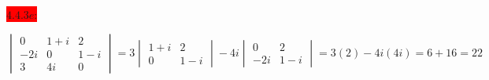 \documentclass{exam}
\begin{document}
  \colorbox{red}{\underline{$4.4.3e$}:}
  \begin{solution}
    \[
      \begin{vmatrix}
        0 & 1 + i & 2 \\
        -2i & 0 & 1 - i \\
        3 & 4i & 0 
      \end{vmatrix}
      = 3\begin{vmatrix}
        1 + i & 2 \\
        0 & 1 - i
      \end{vmatrix}
      -4i\begin{vmatrix}
        0 & 2 \\
        -2i & 1 - i
      \end{vmatrix}
      = 3(2) - 4i(4i) = 6 + 16 = \boxed{22}
    \]
  \end{solution}
\end{document}

